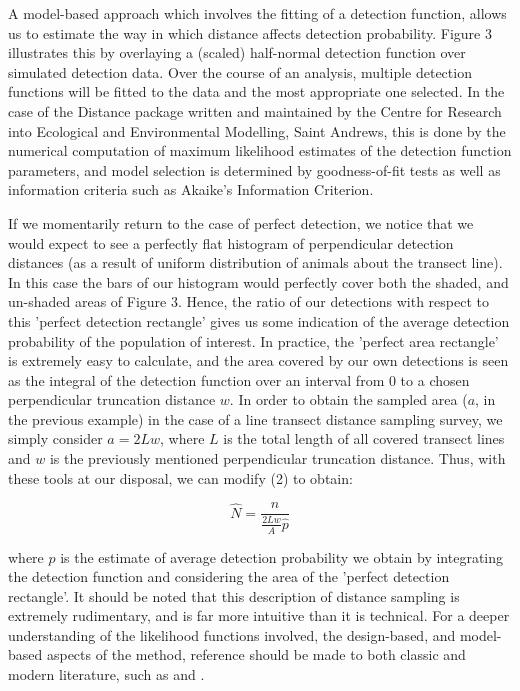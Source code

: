 \documentclass[11pt]{article}
\begin{document}
\begin{multicols}{2}
A model-based approach which involves the fitting of a detection function, allows us to estimate the way in which distance affects detection probability. Figure 3 illustrates this by overlaying a (scaled) half-normal detection function over simulated detection data. Over the course of an analysis, multiple detection functions will be fitted to the data and the most appropriate one selected. In the case of the Distance package written and maintained by the Centre for Research into Ecological and Environmental Modelling, Saint Andrews, this is done by the numerical computation of maximum likelihood estimates of the detection function parameters, and model selection is determined by goodness-of-fit tests as well as information criteria such as Akaike's Information Criterion.


If we momentarily return to the case of perfect detection, we notice that we would expect to see a perfectly flat histogram of perpendicular detection distances (as a result of uniform distribution of animals about the transect line). In this case the bars of our histogram would perfectly cover both the shaded, and un-shaded areas of Figure 3. Hence, the ratio of our detections with respect to this 'perfect detection rectangle' gives us some indication of the average detection probability of the population of interest. In practice, the 'perfect area rectangle' is extremely easy to calculate, and the area covered by our own detections is seen as the integral of the detection function over an interval from $0$ to a chosen perpendicular truncation distance $w$. In order to obtain the sampled area ($a$, in the previous example) in the case of a line transect distance sampling survey, we simply consider $a=2Lw$, where $L$ is the total length of all covered transect lines and $w$ is the previously mentioned perpendicular truncation distance. Thus, with these tools at our disposal, we can modify (2) to obtain:

\begin{equation}
\hat{N}=\frac{n}{\frac{2Lw}{A}\hat{p}}
\end{equation}


where $\hat{p}$ is the estimate of average detection probability we obtain by integrating the detection function and considering the area of the 'perfect detection rectangle'. It should be noted that this description of distance sampling is extremely rudimentary, and is far more intuitive than it is technical. For a deeper understanding of the likelihood functions involved, the design-based, and model-based aspects of the method, reference should be made to both classic and modern literature, such as \cite{EAB} and \cite{DS2015}.


\end{multicols}
\end{document}
